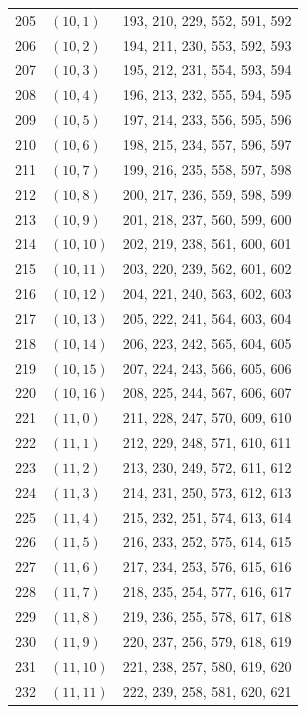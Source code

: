 \documentclass{article}
\begin{document}
\begin{longtable}{lll}
  205 & \((10, 1)\) & 193, 210, 229, 552, 591, 592 \\
  206 & \((10, 2)\) & 194, 211, 230, 553, 592, 593 \\
  207 & \((10, 3)\) & 195, 212, 231, 554, 593, 594 \\
  208 & \((10, 4)\) & 196, 213, 232, 555, 594, 595 \\
  209 & \((10, 5)\) & 197, 214, 233, 556, 595, 596 \\
  210 & \((10, 6)\) & 198, 215, 234, 557, 596, 597 \\
  211 & \((10, 7)\) & 199, 216, 235, 558, 597, 598 \\
  212 & \((10, 8)\) & 200, 217, 236, 559, 598, 599 \\
  213 & \((10, 9)\) & 201, 218, 237, 560, 599, 600 \\
  214 & \((10, 10)\) & 202, 219, 238, 561, 600, 601 \\
  215 & \((10, 11)\) & 203, 220, 239, 562, 601, 602 \\
  216 & \((10, 12)\) & 204, 221, 240, 563, 602, 603 \\
  217 & \((10, 13)\) & 205, 222, 241, 564, 603, 604 \\
  218 & \((10, 14)\) & 206, 223, 242, 565, 604, 605 \\
  219 & \((10, 15)\) & 207, 224, 243, 566, 605, 606 \\
  220 & \((10, 16)\) & 208, 225, 244, 567, 606, 607 \\
  221 & \((11, 0)\) & 211, 228, 247, 570, 609, 610 \\
  222 & \((11, 1)\) & 212, 229, 248, 571, 610, 611 \\
  223 & \((11, 2)\) & 213, 230, 249, 572, 611, 612 \\
  224 & \((11, 3)\) & 214, 231, 250, 573, 612, 613 \\
  225 & \((11, 4)\) & 215, 232, 251, 574, 613, 614 \\
  226 & \((11, 5)\) & 216, 233, 252, 575, 614, 615 \\
  227 & \((11, 6)\) & 217, 234, 253, 576, 615, 616 \\
  228 & \((11, 7)\) & 218, 235, 254, 577, 616, 617 \\
  229 & \((11, 8)\) & 219, 236, 255, 578, 617, 618 \\
  230 & \((11, 9)\) & 220, 237, 256, 579, 618, 619 \\
  231 & \((11, 10)\) & 221, 238, 257, 580, 619, 620 \\
  232 & \((11, 11)\) & 222, 239, 258, 581, 620, 621 \\

\end{longtable}
\end{document}
